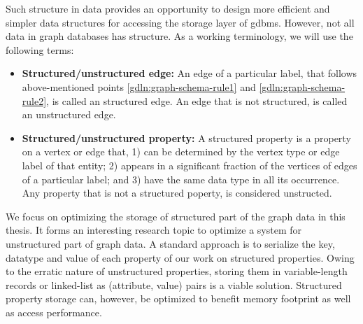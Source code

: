 \begin{guideline}
\begin{enumerate}
\end{enumerate}

Such structure in data provides an opportunity to design more efficient and simpler data structures for accessing the storage layer of \gls{gdbms}. However, not all data in graph databases has structure. As a working terminology, we will use the following terms:

\begin{itemize}
	\item \textbf{Structured/unstructured edge:} An edge of a particular label, that follows above-mentioned points \ref{gdln:graph-schema-rule1} and \ref{gdln:graph-schema-rule2}, is called an structured edge. An edge that is not structured, is called an unstructured edge.
	 
	\item \textbf{Structured/unstructured property:} A structured property is a property on a vertex or edge that, 1) can be determined by the vertex type or edge label of that entity; 2) appears in a significant fraction of the vertices of edges of a particular label; and 3) have the same data type in all its occurrence. Any property that is not a structured poperty, is considered unstructed.
	
\end{itemize}

We focus on optimizing the storage of structured part of the graph data in this thesis. It forms an interesting research topic to optimize a system for unstructured part of graph data. A standard approach is to serialize the key, datatype and value of each property  of our work on structured properties. Owing to the erratic nature of unstructured properties, storing them in variable-length records or linked-list as (attribute, value) pairs is a viable solution. Structured property storage can, however, be optimized to benefit memory footprint as well as access performance.

\end{guideline}

